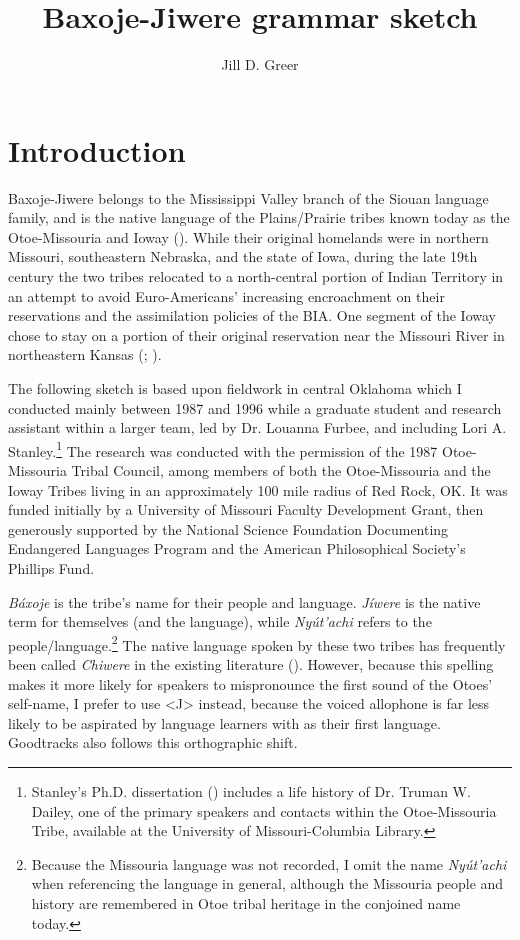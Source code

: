 \documentclass[output=paper]{LSP/langsci}
\author{Jill D. Greer}
\title{{Baxoje-Jiwere} grammar sketch }
\begin{document}
\section{Introduction}

Baxoje-Jiwere belongs to the Mississippi Valley branch of the Siouan language family, and is the native language of the Plains/Prairie tribes known today as the Otoe-Missouria and Ioway (\citealt[3,8]{Goddard1996}).  While their original homelands were in northern Missouri, southeastern Nebraska, and the state of Iowa, during the late 19th century the two tribes relocated to a north-central portion of Indian Territory in an attempt to avoid Euro-Americans' increasing encroachment on their reservations and the assimilation policies of the BIA.  One segment of the Ioway chose to stay on a portion of their original reservation near the Missouri River in northeastern Kansas (\citealt{Wedel2001}; \citealt{Schweitzer2001}).  

The following sketch is based upon fieldwork in central Oklahoma which I conducted mainly between 1987 and 1996 while a graduate student and research assistant within a larger team, led by Dr. Louanna Furbee, and including Lori A. Stanley.\footnote {Stanley's Ph.D. dissertation (\citet{Stanley1993}) includes a life history of Dr. Truman W. Dailey, one of the primary speakers and contacts within the Otoe-Missouria Tribe, available at the University of Missouri-Columbia Library.} The research was conducted with the permission of the 1987 Otoe-Missouria Tribal Council, among members of both the Otoe-Missouria and the Ioway Tribes living in an approximately 100 mile radius of Red Rock, OK.  It was funded initially by a University of Missouri Faculty Development Grant, then generously supported by the National Science Foundation Documenting Endangered Languages Program and the American Philosophical Society's Phillips Fund.

\emph{Báxoje} is the  tribe's name for their people and language.  \emph{J\'iwere} is the native  term for themselves (and the language), while \emph{Nyút'achi} refers to the  people/language.\footnote{Because the Missouria language was not recorded, I omit the name \emph{Nyút'achi} when referencing the language in general, although the Missouria people and history are remembered in Otoe tribal heritage in the conjoined name today.} The native language spoken by these two tribes has frequently been called \textit{Chiwere} in the existing literature (\citealt{Whitman1947, Marsh1936, Wedel2001, Schweitzer2001}).  However, because this spelling makes it more likely for  speakers to mispronounce the first sound of the Otoes' self-name, I prefer to use <J> instead, because the voiced allophone is far less likely to be aspirated by language learners with  as their first language. Goodtracks also follows this orthographic shift.  
\end{document}

